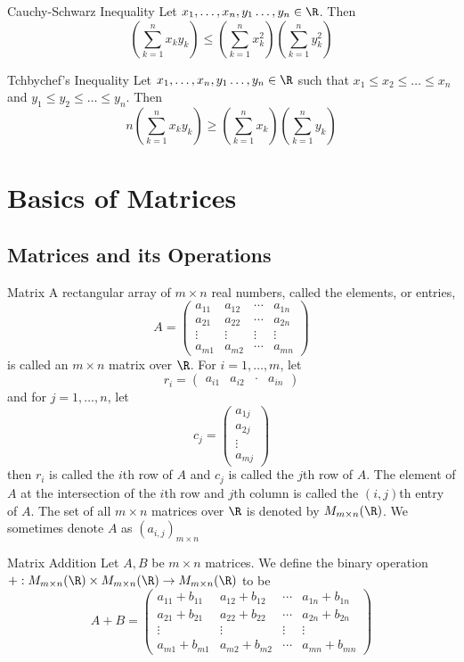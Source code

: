 \begin{thm}{Cauchy-Schwarz Inequality}{} Let $x_1,\dots,x_n,y_1\dots,y_n\in\R$. Then $$\left(\sum_{k=1}^nx_ky_k\right)\leq\left(\sum_{k=1}^nx_k^2\right)\left(\sum_{k=1}^ny_k^2\right)$$
\end{thm}

\begin{thm}{Tchbychef's Inequality}{} Let $x_1,\dots,x_n,y_1\dots,y_n\in\R$ such that $x_1\leq x_2\leq\dots\leq x_n$ and $y_1\leq y_2\leq\dots\leq y_n$. Then $$n\left(\sum_{k=1}^n x_ky_k\right)\geq\left(\sum_{k=1}^nx_k\right)\left(\sum_{k=1}^ny_k\right)$$
\end{thm}

\pagebreak
\section{Basics of Matrices}
\subsection{Matrices and its Operations}
\begin{defn}{Matrix}{} A rectangular array of $m\times n$ real numbers, called the elements, or entries, $$A=
\begin{pmatrix}
a_{11}&a_{12}&\cdots&a_{1n}\\
a_{21}&a_{22}&\cdots&a_{2n}\\
\vdots&\vdots&\vdots&\vdots\\
a_{m1}&a_{m2}&\cdots&a_{mn}
\end{pmatrix}$$ is called an $m\times n$ matrix over $\R$. For $i=1,\dots,m$, let $$r_i=
\begin{pmatrix}
a_{i1}&a_{i2}&\cdot&a_{in}
\end{pmatrix}$$ and for $j=1,\dots,n$, let $$c_j=
\begin{pmatrix}
a_{1j}\\
a_{2j}\\
\vdots\\
a_{mj}
\end{pmatrix}$$ then $r_i$ is called the $i$th row of $A$ and $c_j$ is called the $j$th row of $A$. The element of $A$ at the intersection of the $i$th row and $j$th column is called the $(i,j)$th entry of $A$. The set of all $m\times n$ matrices over $\R$ is denoted by $M_{m\times n}(\R)$. We sometimes denote $A$ as $(a_{i,j})_{m\times n}$
\end{defn}

\begin{defn}{Matrix Addition}{} Let $A,B$ be $m\times n$ matrices. We define the binary operation $+:M_{m\times n}(\R)\times M_{m\times n}(\R)\to M_{m\times n}(\R)$ to be $$A+B=
\begin{pmatrix}
a_{11}+b_{11}&a_{12}+b_{12}&\cdots&a_{1n}+b_{1n}\\
a_{21}+b_{21}&a_{22}+b_{22}&\cdots&a_{2n}+b_{2n}\\
\vdots&\vdots&\vdots&\vdots\\
a_{m1}+b_{m1}&a_{m2}+b_{m2}&\cdots&a_{mn}+b_{mn}
\end{pmatrix}$$
\end{defn}

